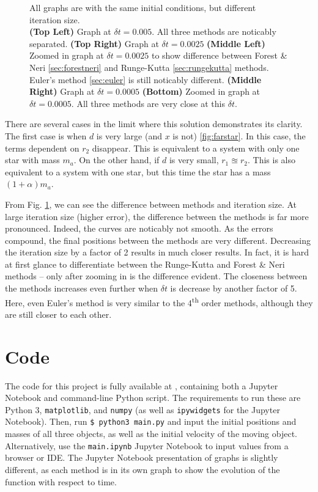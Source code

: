 \documentclass[preprint,titlepage,preprintnumbers,amsmath,amssymb,aps,11pt]{revtex4-2}
\begin{document}
\begin{figure}
    \caption{All graphs are with the same initial conditions, but different iteration size.\\{\bf(Top Left)} Graph at $\delta t=0.005$. All three methods are noticably separated. {\bf(Top Right)} Graph at $\delta t=0.0025$ {\bf(Middle Left)} Zoomed in graph at $\delta t=0.0025$ to show difference between Forest \& Neri \ref{sec:forestneri} and Runge-Kutta \ref{sec:rungekutta} methods. Euler's method \ref{sec:euler} is still noticably different. {\bf(Middle Right)} Graph at $\delta t=0.0005$ {\bf(Bottom)} Zoomed in graph at $\delta t=0.0005$. All three methods are very close at this $\delta t$.}
    \label{fig:diffbetweenmethods}
\end{figure}


There are several cases in the limit where this solution demonstrates its clarity. The first case is when $d$ is very large (and $x$ is not) \ref{fig:farstar}. In this case, the terms dependent on $r_2$ disappear. This is equivalent to a system with only one star with mass $m_a$. On the other hand, if $d$ is very small, $r_1\approxeq r_2$. This is also equivalent to a system with one star, but this time the star has a mass $(1+\alpha)m_a$.

From Fig. \ref{fig:diffbetweenmethods}, we can see the difference between methods and iteration size. At large iteration size (higher error), the difference between the methods is far more pronounced. Indeed, the curves are noticably not smooth. As the errors compound, the final positions between the methods are very different. Decreasing the iteration size by a factor of 2 results in much closer results. In fact, it is hard at first glance to differentiate between the Runge-Kutta and Forest \& Neri methods -- only after zooming in is the difference evident. The closeness between the methods increases even further when $\delta t$ is decrease by another factor of 5. Here, even Euler's method is very similar to the 4\textsuperscript{th} order methods, although they are still closer to each other.


\appendix
\section{Code}\label{sec:code}
The code for this project is fully available at \href{https://github.com/jasperswallen/PHYS304-Project}{},
containing both a Jupyter Notebook and command-line Python script. The requirements to run these are Python 3, \texttt{matplotlib}, and \texttt{numpy} (as well as \texttt{ipywidgets} for the Jupyter Notebook). Then, run \texttt{\$ python3 main.py} and input the initial positions and masses of all three objects, as well as the initial velocity of the moving object. Alternatively, use the \texttt{main.ipynb} Jupyter Notebook to input values from a browser or IDE. The Jupyter Notebook presentation of graphs is slightly different, as each method is in its own graph to show the evolution of the function with respect to time.
\end{document}
